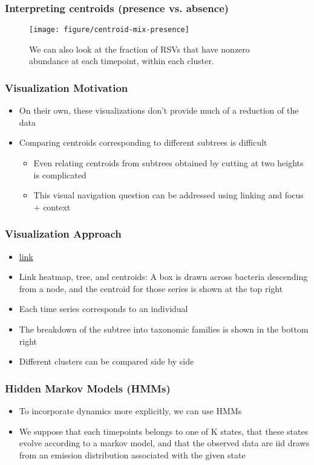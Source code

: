 \documentclass{beamer}
\begin{document}
\begin{frame}
  \frametitle{Interpreting centroids (presence vs. absence)}
\begin{figure}[ht]
  \centering
  \texttt{[image: figure/centroid-mix-presence]}
  \caption{We can also look at the fraction of RSVs that have nonzero abundance
    at each timepoint, within each cluster. \label{fig:centroid-mix-presence} }
\end{figure}
\end{frame}

\begin{frame}
  \frametitle{Visualization Motivation}
  \begin{itemize}
  \item On their own, these visualizations don’t provide much of a reduction of the data
  \item Comparing centroids corresponding to different subtrees is difficult
    \begin{itemize}
    \item Even relating centroids from subtrees obtained by cutting at two heights is complicated
    \item This visual navigation question can be addressed using linking and focus + context
    \end{itemize}
  \end{itemize}
\end{frame}

\begin{frame}
  \frametitle{Visualization Approach}
  \begin{itemize}
  \item \href{/Users/krissankaran/Desktop/100_days/july3/hclust.html}{link}
  \item Link heatmap, tree, and centroids: A box is drawn across bacteria descending from a node, and the centroid for those series is shown at the top right
  \item Each time series corresponds to an individual
  \item The breakdown of the subtree into taxonomic families is shown in the bottom right
  \item Different clusters can be compared side by side
  \end{itemize} 
\end{frame}

\begin{frame}
  \frametitle{Hidden Markov Models (HMMs)}
  \begin{itemize}
  \item To incorporate dynamics more explicitly, we can use HMMs
  \item We suppose that each timepoints belongs to one of K states, that these
    states evolve according to a markov model, and that the observed data are iid
    draws from an emission distribution associated with the given state
  \end{itemize}
\end{frame}
\end{document}
